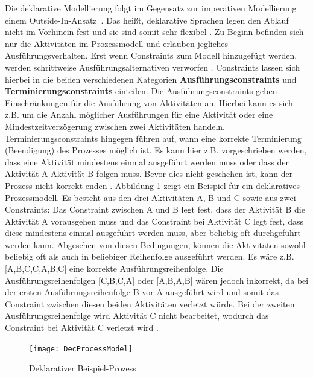  Die deklarative Modellierung folgt im Gegensatz zur imperativen Modellierung einem \grqq Outside-In-Ansatz\grqq \ \cite{lichtenegger2012}. Das heißt, deklarative Sprachen legen den Ablauf nicht im Vorhinein fest \cite{pichler2012} und sie sind somit sehr flexibel \cite{reichert2012}. Zu Beginn befinden sich nur die Aktivitäten im Prozessmodell und erlauben jegliches Ausführungsverhalten. Erst wenn Constraints zum Modell hinzugefügt werden, werden schrittweise Ausführungsalternativen verworfen \cite{pichler2012}. Constraints lassen sich hierbei in die beiden verschiedenen Kategorien \textbf{Ausführungsconstraints} und \textbf{Terminierungsconstraints} einteilen. Die Ausführungsconstraints geben Einschränkungen für die Ausführung von Aktivitäten an. Hierbei kann es sich z.B. um die Anzahl möglicher Ausführungen für eine Aktivität oder eine Mindestzeitverzögerung zwischen zwei Aktivitäten handeln. Terminierungsconstraints hingegen führen auf, wann eine korrekte Terminierung (Beendigung) des Prozesses möglich ist. Es kann hier z.B. vorgeschrieben werden, dass eine Aktivität mindestens einmal ausgeführt werden muss oder dass der Aktivität A Aktivität B folgen muss. Bevor dies nicht geschehen ist, kann der Prozess nicht korrekt enden \cite{reichert2012}.  Abbildung \ref{fig:Dec} zeigt ein Beispiel für ein deklaratives Prozessmodell. Es besteht aus den drei Aktivitäten A, B und C sowie aus zwei Constraints:  Das Constraint zwischen A und B legt fest, dass der Aktivität B die Aktivität A vorausgehen muss und das Constraint bei Aktivität C legt fest, dass diese mindestens einmal ausgeführt werden muss, aber beliebig oft durchgeführt werden kann. Abgesehen von diesen Bedingungen, können die Aktivitäten sowohl beliebig oft als auch in beliebiger Reihenfolge ausgeführt werden. Es wäre z.B. [A,B,C,C,A,B,C] eine korrekte Ausführungsreihenfolge. Die Ausführungsreihenfolgen [C,B,C,A] oder [A,B,A,B] wären jedoch inkorrekt, da bei der ersten Ausführungsreihenfolge B vor A ausgeführt wird und somit das Constraint zwischen diesen beiden Aktivitäten verletzt würde. Bei der zweiten Ausführungsreihenfolge wird Aktivität C nicht bearbeitet, wodurch das Constraint bei Aktivität C verletzt wird \cite{pesic2006}. \newline

\begin{figure}[H]
\begin{center}
  \texttt{[image: DecProcessModel]} %
  \caption{Deklarativer Beispiel-Prozess \cite{pesic2006}}
  \label{fig:Dec}
\end{center}
\end{figure} 

